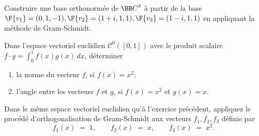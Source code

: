 \documentclass[12pt,french,oneside,a4paper]{memoir} %
\begin{document}
\begin{exo}
Construire une base orthonormée de ${\BB C}^3$ à partir de la base $\F{\mathstrut{v_1}}=(0,1,-1), \F{\mathstrut{v_2}}=(1+i, 1,1), \F{\mathstrut{v_3}}=(1-i,1,1)$ en appliquant 
la méthode de Gram-Schmidt.
\end{exo}
\begin{exo}
Dans l'espace vectoriel euclidien $\mathcal{C}^0([0,1])$ avec le
produit scalaire $f\cdot g=\displaystyle{\int^1_0}f(x)g(x)\,dx$,
déterminer

\begin{enumerate}
\item  la norme du vecteur $f$, si $f(x)=x^2$;

\item  l'angle entre les vecteurs $f$ et $g$, si $f(x)=x^2$ et
$g(x)=x$.
\end{enumerate}
\end{exo}
\begin{exo}
Dans le même espace vectoriel euclidien qu'à l'exercice précédent, appliquez le procédé d'orthogonalisation de Gram-Schmidt aux vecteurs $f_1, f_2, f_3$ définis par
\begin{equation*}
f_1(x)\;=\;1,\qquad
f_2(x)\;=\;x,\qquad
f_3(x)\;=\;x^2.
\end{equation*}
\end{exo}
\end{document}
